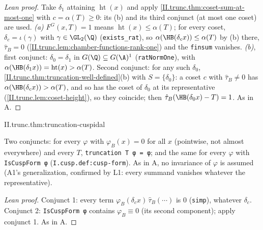 \begin{proof}[Lean proof]
Take $\delta_1$ attaining $\operatorname{ht}(x)$ and apply \cref{II.trunc.thm:coset-sum-at-most-one} with $c=\alpha(T)\ge0$: its (b) and its third conjunct (at most one coset) are used. \emph{(a)} $F^G(x,T)=1$ means $\operatorname{ht}(x)\le\alpha(T)$; for every coset, $\delta_c=\iota(\gamma)$ with $\gamma\in\GL_2(\Q)$ (\texttt{exists\_rat}), so $\alpha(\HB(\delta_cx))\le\alpha(T)$ by (b) there, $\hat\tau_B=0$ (\cref{II.trunc.lem:chamber-functions-rank-one}) and the \texttt{finsum} vanishes. \emph{(b)}, first conjunct: $\delta_0=\delta_1$ in $G(\Q)\subseteq G(\A)^1$ (\texttt{ratNormOne}), with $\alpha(\HB(\delta_1x))=\operatorname{ht}(x)>\alpha(T)$. Second conjunct: for any such $\delta_0$, \cref{II.trunc.thm:truncation-well-defined}(b) with $S=\{\delta_0\}$: a coset $c$ with $\hat\tau_B\ne0$ has $\alpha(\HB(\delta_cx))>\alpha(T)$, and so has the coset of $\delta_0$ at its representative (\cref{II.trunc.lem:coset-height}), so they coincide; then $\hat\tau_B(\HB(\delta_0x)-T)=1$. As in A.
\end{proof}

\begin{theorem}
\end{theorem}
\begin{tfformal}{II.trunc.thm:truncation-cuspidal}
\begin{tffidelity}
Two conjuncts: for every $\varphi$ with $\varphi_B(x)=0$ for all $x$ (pointwise, not almost everywhere) and every $T$, \texttt{truncation T φ = φ}; and the same for every $\varphi$ with \texttt{IsCuspForm φ} (\texttt{I.cusp.def:cusp-form}). As in A, no invariance of $\varphi$ is assumed (A1's generalization, confirmed by L1: every summand vanishes whatever the representative).
\end{tffidelity}
\end{tfformal}
\begin{proof}[Lean proof]
Conjunct 1: every term $\varphi_B(\delta_cx)\,\hat\tau_B(\cdots)$ is $0$ (\texttt{simp}), whatever $\delta_c$. Conjunct 2: \texttt{IsCuspForm φ} contains $\varphi_B\equiv0$ (its second component); apply conjunct 1. As in A.
\end{proof}

